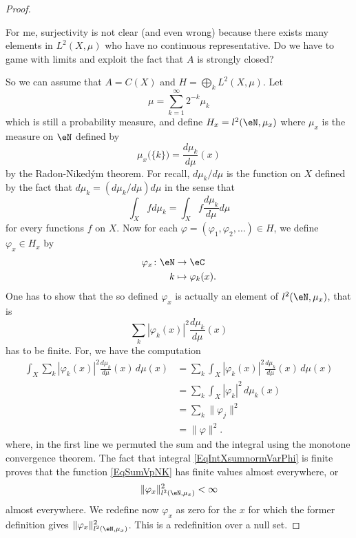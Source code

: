 \begin{proof}
\begin{probleme}
		For me, surjectivity is not clear (and even wrong) because there exists many elements in $L^2(X,\mu)$ who have no continuous representative. Do we have to game with limits and exploit the fact that $A$ is strongly closed?

		\end{probleme}
	So we can assume that $A=C(X)$ and $H=\bigoplus_kL^2(X,\mu)$. Let
	\begin{equation}
		\mu=\sum_{k=1}^{\infty}2^{-k}\mu_k
	\end{equation}
	which is still a probability measure, and define $H_x=l^2(\eN,\mu_x)$ where $\mu_x$ is the measure on $\eN$ defined by
	\begin{equation}
		\mu_x\big( \{ k \} \big)=\frac{ d\mu_k }{ d\mu }(x)
	\end{equation}
	by the Radon-Niked\'ym theorem. For recall, $d\mu_k/d\mu$ is the function on $X$ defined by the fact that $d\mu_k=(d\mu_k/d\mu)d\mu$ in the sense that
	\begin{equation}
		\int_Xfd\mu_k=\int_Xf\frac{ d\mu_k }{ d\mu }d\mu
	\end{equation}
	for every functions $f$ on $X$. Now for each $\varphi=(\varphi_1,\varphi_2,\ldots)\in H$, we define $\varphi_x\in H_x$ by
	\begin{equation}
	\begin{aligned}
	 \varphi_x\colon \eN&\to \eC \\
	   k&\mapsto \varphi_k(x).
	\end{aligned}
	\end{equation}
	One has to show that the so defined $\varphi_x$ is actually an element of $l^2(\eN,\mu_x)$, that is
	\begin{equation}		\label{EqSumVpNK}
		\sum_k| \varphi_k(x) |^2\frac{ d\mu_k }{ d\mu }(x)
	\end{equation}
	has to be finite. For, we have the computation
	\begin{equation}		\label{EqIntXsumnormVarPhi}
	\begin{split}
		\int_X\sum_k| \varphi_k(x) |^2\frac{ d\mu_k }{ d\mu }(x)\,d\mu(x)
			&=\sum_k\int_X| \varphi_k(x) |^2\frac{ d\mu_k }{ d\mu }(x)\,d\mu(x)\\
			& = \sum_k\int_X| \varphi_k |^2\,d\mu_k(x)\\
			& = \sum_k\| \varphi_j \|^2\\
			& = \| \varphi \|^2.
	\end{split}
	\end{equation}
	where, in the first line we permuted the sum and the integral using the monotone convergence theorem. The fact that integral \eqref{EqIntXsumnormVarPhi} is finite proves that the function \eqref{EqSumVpNK} has finite values almost everywhere, or
	\begin{equation}
		\| \varphi_x \|^2_{l^2(\eN,\mu_x)}<\infty
	\end{equation}
	almost everywhere. We redefine now $\varphi_x$ as zero for the $x$ for which the former definition gives $\| \varphi_x \|^2_{l^2(\eN,\mu_x)}$. This is a redefinition over a null set.


\end{proof}
